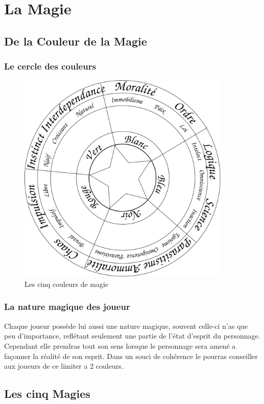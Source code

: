 \chapter{La Magie}
\section{De la Couleur de la Magie}
\label{Couleur}
\subsection{Le cercle des couleurs}
\begin{figure}[h]
    \begin{center}
        \includegraphics[width=4in,height=4in]{./Images/Circle.pdf}
        \caption{Les cinq couleurs de magie}
    \end{center}
\end{figure}

\subsection{La nature magique des joueur}
Chaque joueur possède lui aussi une nature magique, souvent celle-ci n'as que peu d'importance, 
reflétant seulement une partie de l'état d'esprit du personnage.\\
Cependant elle prendras tout son sens lorsque le personnage sera amené a façonner la réalité de son esprit. 
Dans un souci de cohérence le \Gm pourras conseiller aux joueurs de ce limiter a 2 couleurs.

\section{Les cinq Magies}
